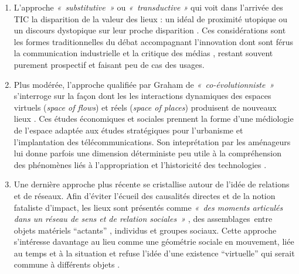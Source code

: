 \begin{enumerate}

\item L’approche \textit{« substitutive »} ou \textit{« transductive »} qui voit dans l’arrivée des TIC la disparition de la valeur des lieux : un idéal de proximité utopique \citep{McLuhan1962} ou un discours dystopique sur leur proche disparition \citep{Virilio1998, Auge1995}. Ces considérations sont les formes traditionnelles du débat accompagnant l’innovation dont sont férus la communication industrielle et la critique des médias \citep{Ramonet2001}, restant souvent purement prospectif et faisant peu de cas des usages.

\item Plus modérée, l’approche qualifiée par Graham de \textit{« co-évolutionniste »} s’interroge sur la façon dont les les interactions dynamiques des espaces virtuels (\textit{space of flows}) et réels (\textit{space of places}) \citep{Castells2009} produisent de nouveaux lieux . Ces études économiques et sociales prennent la forme d’une médiologie de l’espace adaptée aux études stratégiques pour l’urbanisme et l’implantation des télécommunications. Son inteprétation par les aménageurs lui donne parfois une dimension déterministe peu utile à la compréhension des phénomènes liés à l’appropriation et l’historicité des technologies \citep{Offner1993}.

\item Une dernière approche plus récente se cristallise autour de l’idée de relations et de réseaux. Afin d’éviter l’écueil des causalités directes et de la notion fataliste d’impact, les lieux sont présentés comme \textit{« des moments articulés dans un réseau de sens et de relation sociales »} \citep{Massey1993}, des assemblages entre objets matériels “actants” \citep{Latour1996}, individus et groupes sociaux. Cette approche s’intéresse davantage au lieu comme une géométrie sociale en mouvement, liée au temps et à la situation \citep{May2001} et refuse l’idée d’une existence “virtuelle” qui serait commune à différents objets \citep{Bingham1996}.

\end{enumerate}

